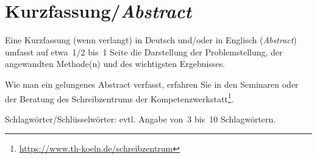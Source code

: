 \chapter*{Kurzfassung/\emph{Abstract}}
\label{chap:abstract}
%
Eine Kurzfassung (wenn verlangt) in Deutsch und/oder in Englisch (\emph{Abstract}) umfasst auf etwa~1/2 bis~1 Seite die Darstellung der Problemstellung, der angewandten Methode(n) und des wichtigsten Ergebnisses.
\par
Wie man ein gelungenes Abstract verfasst, erfahren Sie in den Seminaren oder der Beratung des Schreibzentrums der Kompetenzwerkstatt\footnote{\href{https://www.th-koeln.de/schreibzentrum}{https://www.th-koeln.de/schreibzentrum}}.
\par
Schlagwörter/Schlüsselwörter: evtl. Angabe von~3 bis~10 Schlagwörtern.